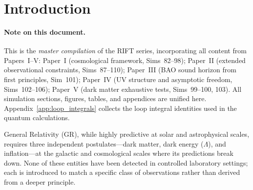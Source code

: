 \documentclass[12pt,a4paper]{article}
\begin{document}
\begin{abstract}
    resolution requires unlocking the action (new $\Psi$--DE coupling or removal
    of bare $\Lambda$), testable by DESI~Y5/Euclid;
(xxiii)~inflationary viability (Sim~110): locked action fails slow-roll inflation ---
    $n_s\approx0.932$ ($>5\sigma$ below Planck $0.9649\pm0.0044$); Starobinsky
    attractor ($n_s=0.967$, $r=0.003$) accessible with UV non-minimal coupling
    $\xi\sim10^4$, testable by CMB-S4/LiteBIRD.
In all cosmological tests (Sims~87--98 and 107--111), RIFT at the joint best-fit is
statistically indistinguishable from $\Lambda$CDM at current precision. The recursive
field coupling $\Lambda_0$ is constrained to $\Lambda_0 < 0.095$ (95\% CL) and is
cosmologically inert at current observational precision. Galactic-scale predictions
require new physics beyond the locked action: a first-principles coupling between
$\Psi$ and baryonic matter. Falsifiable predictions are given for future surveys
(DESI~Y5, Euclid, CMB-S4, LiteBIRD).
\end{abstract}

\tableofcontents
\newpage

\section{Introduction}
\label{sec:intro}

\paragraph{Note on this document.}
This is the \emph{master compilation} of the RIFT series, incorporating
all content from Papers~I--V\@:
Paper~I (cosmological framework, Sims~82--98);
Paper~II (extended observational constraints, Sims~87--110);
Paper~III (BAO sound horizon from first principles, Sim~101);
Paper~IV (UV structure and asymptotic freedom, Sims~102--106);
Paper~V (dark matter exhaustive tests, Sims~99--100, 103).
All simulation sections, figures, tables, and appendices are unified here.
Appendix~\ref{app:loop_integrals} collects the loop integral identities
used in the quantum calculations.

General Relativity (GR), while highly predictive at solar and
astrophysical scales, requires three independent postulates---dark
matter, dark energy ($\Lambda$), and inflation---at the galactic and
cosmological scales where its predictions break down. None of these
entities have been detected in controlled laboratory settings; each
is introduced to match a specific class of observations rather than
derived from a deeper principle.
\end{document}
